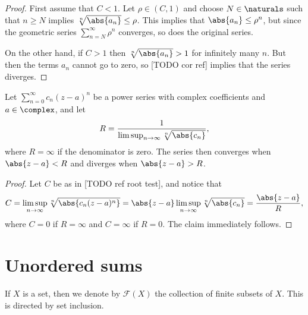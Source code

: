 \documentclass[article, a4paper, 11pt, oneside]{memoir}
\numberwithin{equation}{chapter}
\newcommand{\calF}{\mathcal{F}}
\begin{document}
\begin{proof}
    First assume that $C < 1$. Let $\rho \in (C,1)$ and choose $N \in \naturals$ such that $n \geq N$ implies $\sqrt[n]{\abs{a_n}} \leq \rho$. This implies that $\abs{a_n} \leq \rho^n$, but since the geometric series $\sum_{n=N}^\infty \rho^n$ converges, so does the original series.

    On the other hand, if $C > 1$ then $\sqrt[n]{\abs{a_n}} > 1$ for infinitely many $n$. But then the terms $a_n$ cannot go to zero, so [TODO cor ref] implies that the series diverges.
\end{proof}


\begin{corollary}
    Let $\sum_{n=0}^\infty c_n(z - a)^n$ be a power series with complex coefficients and $a \in \complex$, and let
    \begin{equation*}
        R
            = \frac{1}{ \limsup_{n \to \infty} \sqrt[n]{\abs{c_n}} },
    \end{equation*}
    where $R = \infty$ if the denominator is zero. The series then converges when $\abs{z-a} < R$ and diverges when $\abs{z-a} > R$.
\end{corollary}

\begin{proof}
    Let $C$ be as in [TODO ref root test], and notice that
    \begin{equation*}
        C
            = \limsup_{n \to \infty} \sqrt[n]{\abs{c_n(z-a)^n}}
            = \abs{z-a} \limsup_{n \to \infty} \sqrt[n]{\abs{c_n}}
            = \frac{\abs{z-a}}{R},
    \end{equation*}
    where $C = 0$ if $R = \infty$ and $C = \infty$ if $R = 0$. The claim immediately follows.
\end{proof}


\section{Unordered sums}

\newcommand{\finsubsets}[1]{\calF(#1)}

If $X$ is a set, then we denote by $\finsubsets{X}$ the collection of finite subsets of $X$. This is directed by set inclusion.
\end{document}
